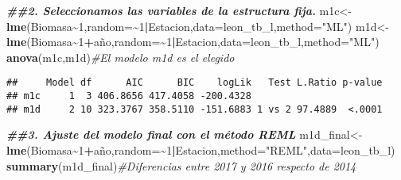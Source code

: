 \documentclass[
]{article}
\newenvironment{Shaded}{\begin{snugshade}}{\end{snugshade}}
\newcommand{\AttributeTok}[1]{\textcolor[rgb]{0.13,0.29,0.53}{#1}}
\newcommand{\CommentTok}[1]{\textcolor[rgb]{0.56,0.35,0.01}{\textit{#1}}}
\newcommand{\DecValTok}[1]{\textcolor[rgb]{0.00,0.00,0.81}{#1}}
\newcommand{\DocumentationTok}[1]{\textcolor[rgb]{0.56,0.35,0.01}{\textbf{\textit{#1}}}}
\newcommand{\FunctionTok}[1]{\textcolor[rgb]{0.13,0.29,0.53}{\textbf{#1}}}
\newcommand{\NormalTok}[1]{#1}
\newcommand{\OtherTok}[1]{\textcolor[rgb]{0.56,0.35,0.01}{#1}}
\newcommand{\SpecialCharTok}[1]{\textcolor[rgb]{0.81,0.36,0.00}{\textbf{#1}}}
\newcommand{\StringTok}[1]{\textcolor[rgb]{0.31,0.60,0.02}{#1}}
\begin{document}
\begin{Shaded}
\begin{Highlighting}[]
\DocumentationTok{\#\#2. Seleccionamos las variables de la estructura fija.}
\NormalTok{m1c}\OtherTok{\textless{}{-}}\FunctionTok{lme}\NormalTok{(Biomasa}\SpecialCharTok{\textasciitilde{}}\DecValTok{1}\NormalTok{,}\AttributeTok{random=}\SpecialCharTok{\textasciitilde{}}\DecValTok{1}\SpecialCharTok{|}\NormalTok{Estacion,}\AttributeTok{data=}\NormalTok{leon\_tb\_l,}\AttributeTok{method=}\StringTok{"ML"}\NormalTok{)}
\NormalTok{m1d}\OtherTok{\textless{}{-}}\FunctionTok{lme}\NormalTok{(Biomasa}\SpecialCharTok{\textasciitilde{}}\DecValTok{1}\SpecialCharTok{+}\NormalTok{año,}\AttributeTok{random=}\SpecialCharTok{\textasciitilde{}}\DecValTok{1}\SpecialCharTok{|}\NormalTok{Estacion,}\AttributeTok{data=}\NormalTok{leon\_tb\_l,}\AttributeTok{method=}\StringTok{"ML"}\NormalTok{)}
\FunctionTok{anova}\NormalTok{(m1c,m1d)}\CommentTok{\#El modelo m1d es el elegido}
\end{Highlighting}
\end{Shaded}

\begin{verbatim}
##     Model df      AIC      BIC    logLik   Test L.Ratio p-value
## m1c     1  3 406.8656 417.4058 -200.4328                       
## m1d     2 10 323.3767 358.5110 -151.6883 1 vs 2 97.4889  <.0001
\end{verbatim}

\begin{Shaded}
\begin{Highlighting}[]
\DocumentationTok{\#\#3. Ajuste del modelo final con el método REML}
\NormalTok{m1d\_final}\OtherTok{\textless{}{-}}\FunctionTok{lme}\NormalTok{(Biomasa}\SpecialCharTok{\textasciitilde{}}\DecValTok{1}\SpecialCharTok{+}\NormalTok{año,}\AttributeTok{random=}\SpecialCharTok{\textasciitilde{}}\DecValTok{1}\SpecialCharTok{|}\NormalTok{Estacion,}\AttributeTok{method=}\StringTok{"REML"}\NormalTok{,}\AttributeTok{data=}\NormalTok{leon\_tb\_l)}
\FunctionTok{summary}\NormalTok{(m1d\_final)}\CommentTok{\#Diferencias entre 2017 y 2016 respecto de 2014}
\end{Highlighting}
\end{Shaded}
\end{document}
